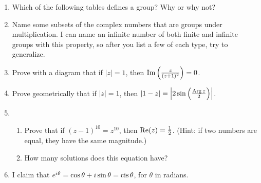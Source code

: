 \documentclass[../textbook.tex]{subfiles}
\begin{document}
\begin{enumerate}
\item Which of the following tables defines a group? Why or why not?
\begin{enumerate}
\end{enumerate}
\item Name some subsets of the complex numbers that are groups under multiplication. I can name an infinite number of both finite and infinite groups with this property, so after you list a few of each type, try to generalize.
\item Prove with a diagram that if $|z|=1$, then $\operatorname{Im}\left(\frac{z}{(z+1)^2}\right)=0$.
\item Prove geometrically that if $|z|=1$, then $|1-z|=\left|2\sin\left(\frac{\operatorname{Arg} z}{2}\right)\right|$.
\item \begin{enumerate}
\item Prove that if $(z-1)^{10}=z^{10}$, then $\operatorname{Re} (z) = \frac{1}{2}$. (Hint: if two numbers are equal, they have the same magnitude.)
\item How many solutions does this equation have?
\end{enumerate}
\item I claim that $e^{i\theta}=\cos\theta + i\sin\theta = \operatorname{cis}\theta$, for $\theta$ in radians.


\end{enumerate}
\end{document}
